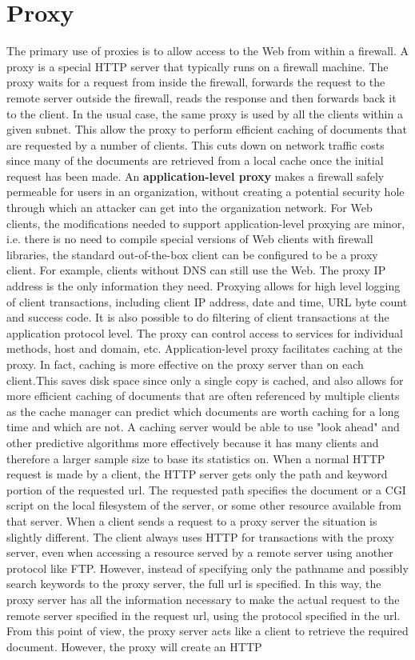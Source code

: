 \documentclass[11pt]{article}
\begin{document}
\section{Proxy}
The primary use of proxies is to allow access to the Web from within a firewall. A proxy is a special HTTP server that typically runs on a firewall machine. The proxy waits for a request from inside the firewall, forwards the request to the remote server outside the firewall, reads the response and then forwards back it to the client. In the usual case, the same proxy is used by all the clients within a given subnet. This allow the proxy to perform efficient caching of documents that are requested by a number of clients. This cuts down on network traffic costs since many of the documents are retrieved from a local cache once the initial request has been made. An \textbf{application-level proxy} makes a firewall safely permeable for users in an organization, without creating a potential security hole through which an attacker can get into the organization network. For Web clients, the modifications needed to support application-level proxying are minor, i.e. there is no need to compile special versions of Web clients with firewall libraries, the standard out-of-the-box client can be configured to be a proxy client. For example, clients without DNS can still use the Web. The proxy IP address is the only information they need. Proxying allows for high level logging of client transactions, including client IP address, date and time, URL byte count and success code. It is also possible to do filtering of client transactions at the application protocol level. The proxy can control access to services for individual methods, host and domain, etc. Application-level proxy facilitates caching at the proxy. In fact, caching is more effective on the proxy server than on each client.This saves disk space since only a single copy is cached, and also allows for more efficient caching of documents that are often referenced by multiple clients as the cache manager can predict which documents are worth caching for a long time and which are not. A caching server would be able to use "look ahead" and other predictive algorithms more effectively because it has many clients and therefore a larger sample size to base its statistics on. When a normal HTTP request is made by a client, the HTTP server gets only the path and keyword portion of the requested url. The requested path specifies the document or a CGI script on the local filesystem of the server, or some other resource available from that server. When a client sends a request to a proxy server the situation is slightly different. The client always uses HTTP for transactions with the proxy server, even when accessing a resource served by a remote server using another protocol like FTP. However, instead of specifying only the pathname and possibly search keywords to the proxy server, the full url is specified. In this way, the proxy server has all the information necessary to make the actual request to the remote server specified in the request url, using the protocol specified in the url. From this point of view, the proxy server acts like a client to retrieve the required document. However, the proxy will create an HTTP 
\end{document}
